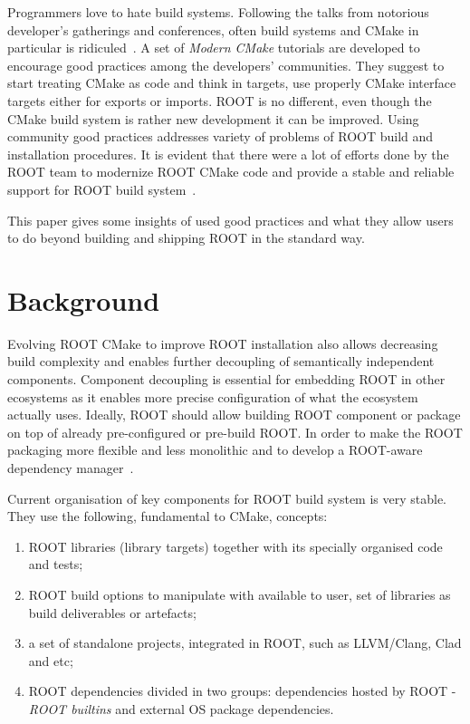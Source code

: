 \documentclass[12pt]{iopart}
\begin{document}
Programmers love to hate build systems. Following the talks from notorious developer's gatherings and conferences, often build systems and CMake in particular is ridiculed~\cite{moderncmake}. A set of \textit{Modern CMake} tutorials are developed to encourage good practices among the developers' communities. They suggest to start treating CMake as code and think in targets, use properly CMake interface targets either for exports or imports. ROOT is no different, even though the CMake build system is rather new development it can be improved. Using community good practices addresses variety of problems of ROOT build and installation procedures. It is evident that there were a lot of efforts done by the ROOT team to modernize ROOT CMake code and provide a stable and reliable support for ROOT build system~\cite{rootcmake}.

This paper gives some insights of used good practices and what they allow users to do beyond building and shipping ROOT in the standard way.

\section{Background}

Evolving ROOT CMake to improve ROOT installation also allows decreasing build complexity and enables further decoupling of semantically independent components. Component decoupling is essential for embedding ROOT in other ecosystems as it enables more precise configuration of what the ecosystem actually uses. Ideally, ROOT should allow building ROOT component or package on top of already pre-configured or pre-build ROOT. In order to make the ROOT packaging more flexible and less monolithic and to develop a ROOT-aware dependency manager~\cite{pm}.


Current organisation of key components for ROOT build system is very stable. They use the following, fundamental to CMake, concepts:
\begin{enumerate}
    \item ROOT libraries (library targets) together with its specially organised code and tests;
    \item ROOT build options to manipulate with available to user, set of libraries as build deliverables or artefacts;
    \item a set of standalone projects, integrated in ROOT, such as LLVM/Clang, Clad and etc;
    \item ROOT dependencies divided in two groups: dependencies  hosted by ROOT - \textit{ROOT builtins} and external OS package dependencies.
\end{enumerate}
\end{document}
